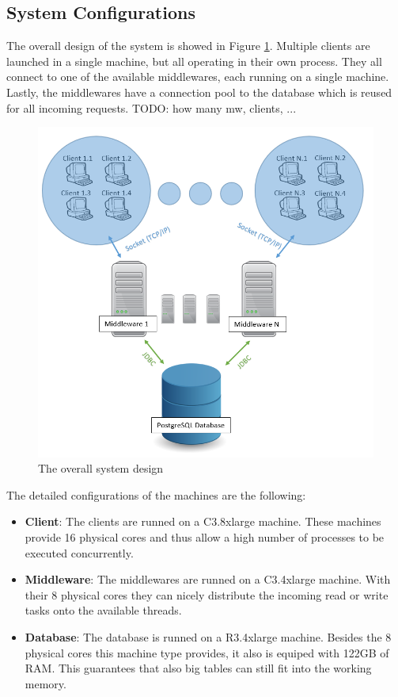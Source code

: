 \documentclass[11pt]{article}
\begin{document}
\subsection{System Configurations}\label{sec:system-configurations}
The overall design of the system is showed in Figure \ref{fig:overall_design}. Multiple clients are launched in a single machine, but all operating in their own process. They all connect to one of the available middlewares, each running on a single machine. Lastly, the middlewares have a connection pool to the database which is reused for all incoming requests.\newline
TODO: how many mw, clients, ...\newline
\begin{figure}
\centering
\includegraphics[width=0.7\linewidth]{figures/overall_design}
\caption{The overall system design}
\label{fig:overall_design}
\end{figure}
The detailed configurations of the machines are the following:
\begin{itemize}
	\item \textbf{Client}: The clients are runned on a C3.8xlarge machine. These machines provide 16 physical cores and thus allow a high number of processes to be executed concurrently.
	\item \textbf{Middleware}: The middlewares are runned on a C3.4xlarge machine. With their 8 physical cores they can nicely distribute the incoming read or write tasks onto the available threads.
	\item \textbf{Database}: The database is runned on a R3.4xlarge machine. Besides the 8 physical cores this machine type provides, it also is equiped with 122GB of RAM. This guarantees that also big tables can still fit into the working memory.
\end{itemize}
\end{document}
